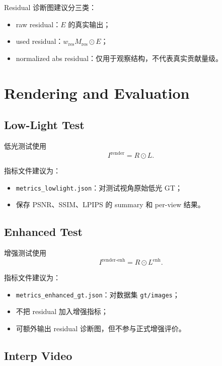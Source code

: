 \documentclass[11pt]{article}
\begin{document}
Residual 诊断图建议分三类：
\begin{itemize}[leftmargin=1.5em]
    \item raw residual：$E$ 的真实输出；
    \item used residual：$w_{\text{res}}M_{\text{res}}\odot E$；
    \item normalized abs residual：仅用于观察结构，不代表真实贡献量级。
\end{itemize}

\section{Rendering and Evaluation}

\subsection{Low-Light Test}

低光测试使用
\begin{equation}
    I^{\text{render}} = R \odot L.
\end{equation}

指标文件建议为：
\begin{itemize}[leftmargin=1.5em]
    \item \texttt{metrics\_lowlight.json}：对测试视角原始低光 GT；
    \item 保存 PSNR、SSIM、LPIPS 的 summary 和 per-view 结果。
\end{itemize}

\subsection{Enhanced Test}

增强测试使用
\begin{equation}
    I^{\text{render-enh}} = R \odot L^{\text{enh}}.
\end{equation}

指标文件建议为：
\begin{itemize}[leftmargin=1.5em]
    \item \texttt{metrics\_enhanced\_gt.json}：对数据集 \texttt{gt/images}；
    \item 不把 residual 加入增强指标；
    \item 可额外输出 residual 诊断图，但不参与正式增强评价。
\end{itemize}

\subsection{Interp Video}
\end{document}
